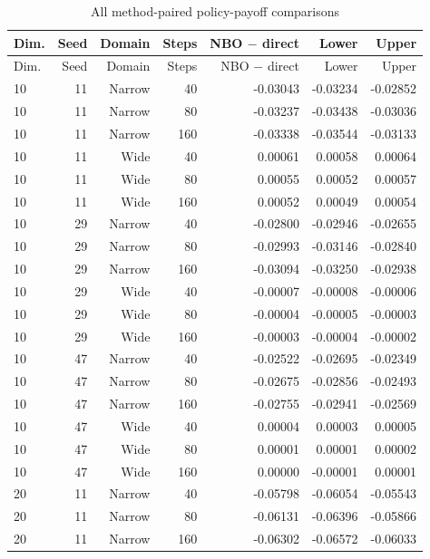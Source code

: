 \begin{small}
\begin{longtable}{lrrrrrr}
\caption{All method-paired policy-payoff comparisons}\\
\toprule
Dim. & Seed & Domain & Steps & NBO $-$ direct & Lower & Upper \\
\midrule\endfirsthead
\toprule
Dim. & Seed & Domain & Steps & NBO $-$ direct & Lower & Upper \\
\midrule\endhead
10 & 11 & Narrow & 40 & -0.03043 & -0.03234 & -0.02852 \\
10 & 11 & Narrow & 80 & -0.03237 & -0.03438 & -0.03036 \\
10 & 11 & Narrow & 160 & -0.03338 & -0.03544 & -0.03133 \\
10 & 11 & Wide & 40 & 0.00061 & 0.00058 & 0.00064 \\
10 & 11 & Wide & 80 & 0.00055 & 0.00052 & 0.00057 \\
10 & 11 & Wide & 160 & 0.00052 & 0.00049 & 0.00054 \\
10 & 29 & Narrow & 40 & -0.02800 & -0.02946 & -0.02655 \\
10 & 29 & Narrow & 80 & -0.02993 & -0.03146 & -0.02840 \\
10 & 29 & Narrow & 160 & -0.03094 & -0.03250 & -0.02938 \\
10 & 29 & Wide & 40 & -0.00007 & -0.00008 & -0.00006 \\
10 & 29 & Wide & 80 & -0.00004 & -0.00005 & -0.00003 \\
10 & 29 & Wide & 160 & -0.00003 & -0.00004 & -0.00002 \\
10 & 47 & Narrow & 40 & -0.02522 & -0.02695 & -0.02349 \\
10 & 47 & Narrow & 80 & -0.02675 & -0.02856 & -0.02493 \\
10 & 47 & Narrow & 160 & -0.02755 & -0.02941 & -0.02569 \\
10 & 47 & Wide & 40 & 0.00004 & 0.00003 & 0.00005 \\
10 & 47 & Wide & 80 & 0.00001 & 0.00001 & 0.00002 \\
10 & 47 & Wide & 160 & 0.00000 & -0.00001 & 0.00001 \\
20 & 11 & Narrow & 40 & -0.05798 & -0.06054 & -0.05543 \\
20 & 11 & Narrow & 80 & -0.06131 & -0.06396 & -0.05866 \\
20 & 11 & Narrow & 160 & -0.06302 & -0.06572 & -0.06033 \\

\end{longtable}
\end{small}
